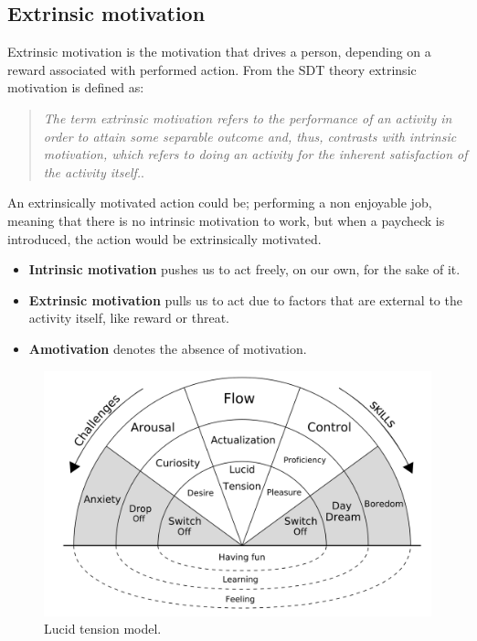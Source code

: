 \subsection*{Extrinsic motivation}
	Extrinsic motivation is the motivation that drives a person, depending on a reward associated with performed action\cite{SDT}. From the SDT theory extrinsic motivation is defined as: 
	\begin{quote}
		\textit{The term extrinsic motivation refers to the performance of an activity in order to attain some separable outcome and, thus, contrasts with intrinsic motivation, which refers to doing an activity for the inherent satisfaction of the activity itself.}\cite[p.~71]{SDT}.\\
	\end{quote}
	An extrinsically motivated action could be; performing a non enjoyable job, meaning that there is no intrinsic motivation to work, but when a paycheck is introduced, the action would be extrinsically motivated.

\begin{itemize}
	\item[ ] \textbf{Intrinsic motivation} pushes us to act freely, on our own, for the sake of it.\\
	\item[ ] \textbf{Extrinsic motivation} pulls us to act due to factors that are external to the activity itself, like reward or threat.\\
	\item[] \textbf{Amotivation} denotes the absence of motivation.\\
\end{itemize}

\begin{figure}[H]
	\centering
	\includegraphics[width=0.7\linewidth]{figure/Analysis/motivation}
	\caption{Lucid tension model.}
	\label{fig:lucidTension}
\end{figure}

